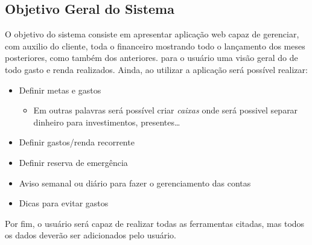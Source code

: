 \subsection{Objetivo Geral do Sistema}

O objetivo do sistema consiste em apresentar aplicação web capaz de gerenciar, com auxilio do cliente, toda o financeiro mostrando todo o lançamento dos meses posteriores, como também dos anteriores. para o usuário uma visão geral do de todo gasto  e renda realizados. Ainda, ao utilizar a aplicação será possível realizar:

\begin{itemize}
    \item Definir metas e gastos
    \begin{itemize}
        \item Em outras palavras será possível criar \textit{caixas} onde será possivel separar dinheiro para investimentos, presentes\dots 
    \end{itemize}
    \item Definir gastos/renda recorrente
    \item Definir reserva de emergência
    \item Aviso semanal ou diário para fazer o gerenciamento das contas
    \item Dicas para evitar gastos
\end{itemize}


Por fim, o usuário será capaz de realizar todas as ferramentas citadas, mas todos os dados deverão ser adicionados pelo usuário.

